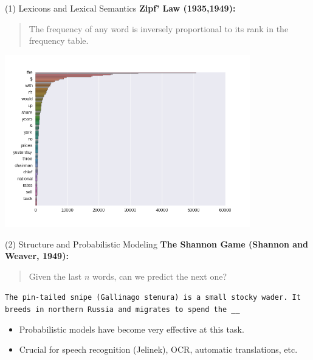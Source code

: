 \documentclass{beamer}
\begin{document}
\begin{frame}{(1) Lexicons and Lexical Semantics}
  \textbf{Zipf' Law (1935,1949):}
  \begin{quote}
    The frequency of any word is inversely proportional to its rank in the frequency table.
  \end{quote}


     \begin{center}
       \includegraphics[width=0.8\textwidth]{../notebooks/zipf}         
     \end{center}
\end{frame}


\begin{frame}{(2) Structure and Probabilistic Modeling }
  \textbf{The Shannon Game (Shannon and Weaver, 1949):}
  \begin{quote}
    Given the last $n$ words, can we predict the next one?
  \end{quote} 
  

  \texttt{The pin-tailed snipe (Gallinago stenura) is a small stocky wader. It breeds in northern Russia and migrates to spend the \_\_ } 


  \begin{itemize}
  \item Probabilistic models have become very effective at this task.
  \item Crucial for speech recognition (Jelinek), OCR, automatic translations, etc. 
  \end{itemize}



\end{frame}
\end{document}
